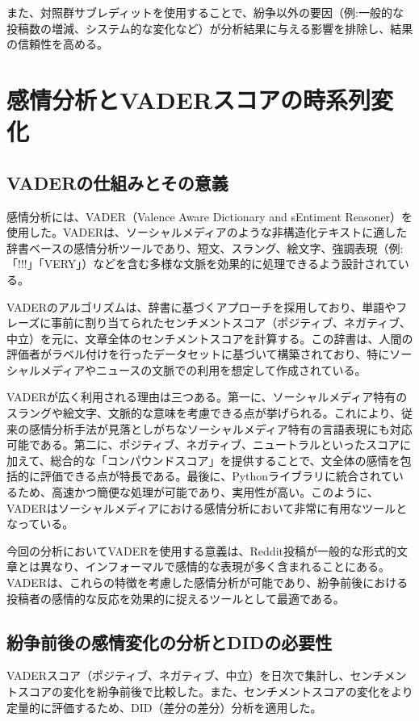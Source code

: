 \documentclass[11pt, a4j]{jreport}
\begin{document}
    また、対照群サブレディットを使用することで、紛争以外の要因（例:一般的な投稿数の増減、システム的な変化など）が分析結果に与える影響を排除し、結果の信頼性を高める。

    \section{感情分析とVADERスコアの時系列変化}

    \subsection{VADERの仕組みとその意義}
    感情分析には、VADER（Valence Aware Dictionary and sEntiment Reasoner）を使用した。VADERは、ソーシャルメディアのような非構造化テキストに適した辞書ベースの感情分析ツールであり、短文、スラング、絵文字、強調表現（例:「!!!」「VERY」）などを含む多様な文脈を効果的に処理できるよう設計されている。

    VADERのアルゴリズムは、辞書に基づくアプローチを採用しており、単語やフレーズに事前に割り当てられたセンチメントスコア（ポジティブ、ネガティブ、中立）を元に、文章全体のセンチメントスコアを計算する。この辞書は、人間の評価者がラベル付けを行ったデータセットに基づいて構築されており、特にソーシャルメディアやニュースの文脈での利用を想定して作成されている。

    VADERが広く利用される理由は三つある。第一に、ソーシャルメディア特有のスラングや絵文字、文脈的な意味を考慮できる点が挙げられる。これにより、従来の感情分析手法が見落としがちなソーシャルメディア特有の言語表現にも対応可能である。第二に、ポジティブ、ネガティブ、ニュートラルといったスコアに加えて、総合的な「コンパウンドスコア」を提供することで、文全体の感情を包括的に評価できる点が特長である。最後に、Pythonライブラリに統合されているため、高速かつ簡便な処理が可能であり、実用性が高い。このように、VADERはソーシャルメディアにおける感情分析において非常に有用なツールとなっている。

    今回の分析においてVADERを使用する意義は、Reddit投稿が一般的な形式的文章とは異なり、インフォーマルで感情的な表現が多く含まれることにある。VADERは、これらの特徴を考慮した感情分析が可能であり、紛争前後における投稿者の感情的な反応を効果的に捉えるツールとして最適である。

    \subsection{紛争前後の感情変化の分析とDIDの必要性}
    VADERスコア（ポジティブ、ネガティブ、中立）を日次で集計し、センチメントスコアの変化を紛争前後で比較した。また、センチメントスコアの変化をより定量的に評価するため、DID（差分の差分）分析を適用した。
\end{document}
